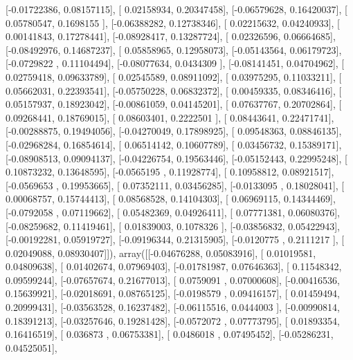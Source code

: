 \documentclass{article}
\begin{document}
       [-0.01722386,  0.08157115],
       [ 0.02158934,  0.20347458],
       [-0.06579628,  0.16420037],
       [ 0.05780547,  0.1698155 ],
       [-0.06388282,  0.12738346],
       [ 0.02215632,  0.04240933],
       [ 0.00141843,  0.17278441],
       [-0.08928417,  0.13287724],
       [ 0.02326596,  0.06664685],
       [-0.08492976,  0.14687237],
       [ 0.05858965,  0.12958073],
       [-0.05143564,  0.06179723],
       [-0.0729822 ,  0.11104494],
       [-0.08077634,  0.0434309 ],
       [-0.08141451,  0.04704962],
       [ 0.02759418,  0.09633789],
       [ 0.02545589,  0.08911092],
       [ 0.03975295,  0.11033211],
       [ 0.05662031,  0.22393541],
       [-0.05750228,  0.06832372],
       [ 0.00459335,  0.08346416],
       [ 0.05157937,  0.18923042],
       [-0.00861059,  0.04145201],
       [ 0.07637767,  0.20702864],
       [ 0.09268441,  0.18769015],
       [ 0.08603401,  0.2222501 ],
       [ 0.08443641,  0.22471741],
       [-0.00288875,  0.19494056],
       [-0.04270049,  0.17898925],
       [ 0.09548363,  0.08846135],
       [-0.02968284,  0.16854614],
       [ 0.06514142,  0.10607789],
       [ 0.03456732,  0.15389171],
       [-0.08908513,  0.09094137],
       [-0.04226754,  0.19563446],
       [-0.05152443,  0.22995248],
       [ 0.10873232,  0.13648595],
       [-0.0565195 ,  0.11928774],
       [ 0.10958812,  0.08921517],
       [-0.0569653 ,  0.19953665],
       [ 0.07352111,  0.03456285],
       [-0.0133095 ,  0.18028041],
       [ 0.00068757,  0.15744413],
       [ 0.08568528,  0.14104303],
       [ 0.06969115,  0.14344469],
       [-0.0792058 ,  0.07119662],
       [ 0.05482369,  0.04926411],
       [ 0.07771381,  0.06080376],
       [-0.08259682,  0.11419461],
       [ 0.01839003,  0.1078326 ],
       [-0.03856832,  0.05422943],
       [-0.00192281,  0.05919727],
       [-0.09196344,  0.21315905],
       [-0.0120775 ,  0.2111217 ],
       [ 0.02049088,  0.08930407]]), array([[-0.04676288,  0.05083916],
       [ 0.01019581,  0.04809638],
       [ 0.01402674,  0.07969403],
       [-0.01781987,  0.07646363],
       [ 0.11548342,  0.09599244],
       [-0.07657674,  0.21677013],
       [ 0.0759091 ,  0.07000608],
       [-0.00416536,  0.15639921],
       [-0.02018691,  0.08765125],
       [-0.0198579 ,  0.09416157],
       [ 0.01459494,  0.20999431],
       [-0.03563528,  0.16237482],
       [-0.06115516,  0.0444003 ],
       [-0.00990814,  0.18391213],
       [-0.03257646,  0.19281428],
       [-0.0572072 ,  0.07773795],
       [ 0.01893354,  0.16416519],
       [ 0.036873  ,  0.06753381],
       [ 0.0486018 ,  0.07495452],
       [-0.05286231,  0.04525051],
\end{document}
